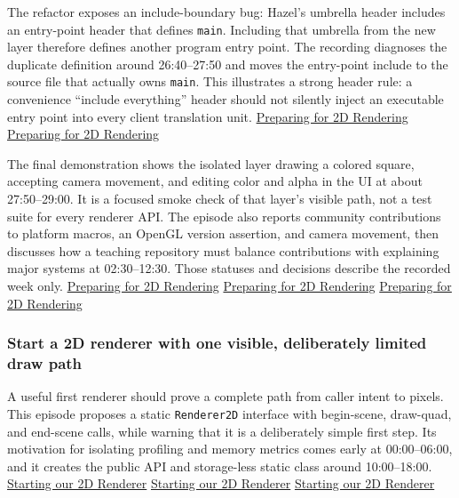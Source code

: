 The refactor exposes an include-boundary bug: Hazel's umbrella header includes an entry-point header that defines \texttt{main}. Including that umbrella from the new layer therefore defines another program entry point. The recording diagnoses the duplicate definition around 26:40--27:50 and moves the entry-point include to the source file that actually owns \texttt{main}. This illustrates a strong header rule: a convenience ``include everything'' header should not silently inject an executable entry point into every client translation unit. \href{https://www.youtube.com/watch?v=sEiZZ2APlDs&t=1600s}{Preparing for 2D Rendering} \href{https://www.youtube.com/watch?v=sEiZZ2APlDs&t=1670s}{Preparing for 2D Rendering}

The final demonstration shows the isolated layer drawing a colored square, accepting camera movement, and editing color and alpha in the UI at about 27:50--29:00. It is a focused smoke check of that layer's visible path, not a test suite for every renderer API. The episode also reports community contributions to platform macros, an OpenGL version assertion, and camera movement, then discusses how a teaching repository must balance contributions with explaining major systems at 02:30--12:30. Those statuses and decisions describe the recorded week only. \href{https://www.youtube.com/watch?v=sEiZZ2APlDs&t=1670s}{Preparing for 2D Rendering} \href{https://www.youtube.com/watch?v=sEiZZ2APlDs&t=150s}{Preparing for 2D Rendering} \href{https://www.youtube.com/watch?v=sEiZZ2APlDs&t=600s}{Preparing for 2D Rendering}

\subsubsection{Start a 2D renderer with one visible, deliberately limited draw path}\label{start-a-2d-renderer-with-one-visible-deliberately-limited-draw-path}

A useful first renderer should prove a complete path from caller intent to pixels. This episode proposes a static \texttt{Renderer2D} interface with begin-scene, draw-quad, and end-scene calls, while warning that it is a deliberately simple first step. Its motivation for isolating profiling and memory metrics comes early at 00:00--06:00, and it creates the public API and storage-less static class around 10:00--18:00. \href{https://www.youtube.com/watch?v=r_5fF1AxgpU&t=0s}{Starting our 2D Renderer} \href{https://www.youtube.com/watch?v=r_5fF1AxgpU&t=360s}{Starting our 2D Renderer} \href{https://www.youtube.com/watch?v=r_5fF1AxgpU&t=600s}{Starting our 2D Renderer}

